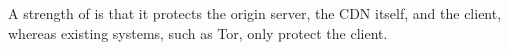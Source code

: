 

A strength of \system{} is that it protects the origin server, the CDN itself, and the client, whereas 
existing systems, such as Tor, only protect the client.

